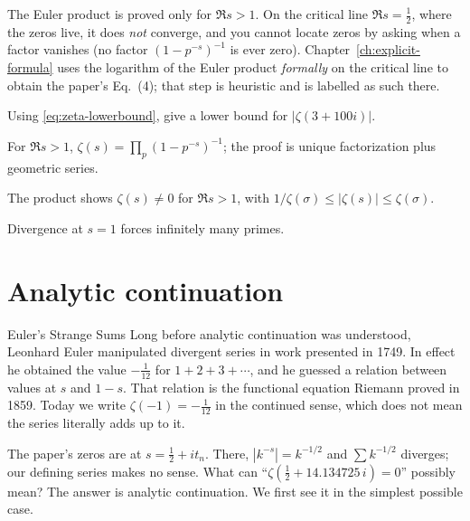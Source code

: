\begin{pitfall}
The Euler product is proved only for $\Re s>1$. On the critical line $\Re s=\tfrac12$, where the zeros live, it does \emph{not} converge, and you cannot locate zeros by asking when a factor vanishes (no factor $(1-p^{-s})^{-1}$ is ever zero). Chapter~\ref{ch:explicit-formula} uses the logarithm of the Euler product \emph{formally} on the critical line to obtain the paper's Eq.~(4); that step is heuristic and is labelled as such there.
\end{pitfall}

\begin{checkpoint}
Using \cref{eq:zeta-lowerbound}, give a lower bound for $|\zeta(3+100i)|$.
\end{checkpoint}

\begin{keyideas}
\item For $\Re s>1$, $\zeta(s)=\prod_p(1-p^{-s})^{-1}$; the proof is unique factorization plus geometric series.
\item The product shows $\zeta(s)\ne0$ for $\Re s>1$, with $1/\zeta(\sigma)\le|\zeta(s)|\le\zeta(\sigma)$.
\item Divergence at $s=1$ forces infinitely many primes.
\end{keyideas}

\section{Analytic continuation}\label{sec:zeta-continuation}
\begin{didyouknow}{Euler's Strange Sums}
Long before analytic continuation was understood, Leonhard Euler manipulated divergent series in work presented in 1749. In effect he obtained the value $-\tfrac1{12}$ for $1+2+3+\cdots$, and he guessed a relation between values at $s$ and $1-s$. That relation is the functional equation Riemann proved in 1859. Today we write $\zeta(-1)=-\tfrac1{12}$ in the continued sense, which does not mean the series literally adds up to it.
\end{didyouknow}

The paper's zeros are at $s=\tfrac12+it_n$. There, $|k^{-s}|=k^{-1/2}$ and $\sum k^{-1/2}$ diverges; our defining series makes no sense. What can ``$\zeta(\tfrac12+14.134725\,i)=0$'' possibly mean? The answer is analytic continuation. We first see it in the simplest possible case.

